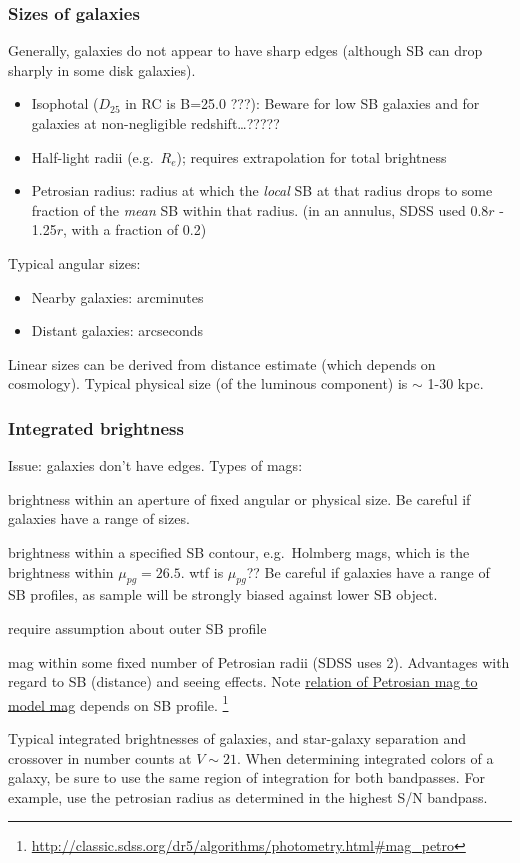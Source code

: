 \documentclass{article}
\newcommand{\mynotes}[1]{\textcolor{cadmiumgreen}{#1}}
\begin{document}
\subsubsection{Sizes of galaxies}
Generally, galaxies do not appear to have sharp edges (although SB can
drop sharply in some disk galaxies).
\begin{itemize}
    \item Isophotal ($D_{25}$ in RC is B=25.0 \mynotes{???}):
        Beware for low SB galaxies and for galaxies
        at non-negligible redshift\ldots\mynotes{?????}
    \item Half-light radii (e.g.\ $R_{e}$); requires extrapolation for
        total brightness
    \item Petrosian radius: radius at which the \emph{local}
        SB at that radius drops to some fraction of the \emph{mean} SB within
        that radius.  (in an annulus, SDSS used 0.8$r$ - 1.25$r$, with a
        fraction of 0.2)
\end{itemize}
Typical angular sizes:
\begin{itemize}
    \item Nearby galaxies: arcminutes
    \item Distant galaxies: arcseconds
\end{itemize}
Linear sizes can be derived from distance estimate
(which depends on cosmology). Typical physical size (of the luminous
component) is $\sim$ 1-30 kpc.

\subsubsection{Integrated brightness}\label{intb}
Issue: galaxies don't have edges. Types of mags:
\begin{description}[align=right, labelwidth=0.5in,
        labelindent=0.25in, leftmargin=1in]
    \item [Metric:] brightness within an aperture of fixed angular or physical
        size. Be careful if galaxies have a range of sizes.
    \item [Isophotal:] brightness within a specified SB contour, e.g.\ Holmberg
        mags, which is the brightness within $\mu_{pg} = 26.5$. \mynotes{wtf is
        $\mu_{pg}$??} Be careful if galaxies have a range of SB profiles, as
        sample will be strongly biased against lower SB object.
    \item [Model:] require assumption about outer SB profile
    \item [Petrosian:]
        mag within some fixed number of Petrosian
        radii (SDSS uses 2).
        Advantages with regard to SB (distance) and seeing effects. Note
        \href{http://astronomy.nmsu.edu/holtz/a555/images/petrogal.htm}
        {relation of Petrosian mag to model mag} depends on SB profile.
        \footnote{\url{http://classic.sdss.org/dr5/algorithms/photometry.html\#mag_petro}}
\end{description}
Typical integrated brightnesses of galaxies, and star-galaxy separation
and crossover in number counts at $V \sim 21$.
When determining integrated colors of a galaxy, be sure to use the same
region of integration for both bandpasses.
For example, use the petrosian radius as determined in the highest S/N bandpass.
\end{document}
